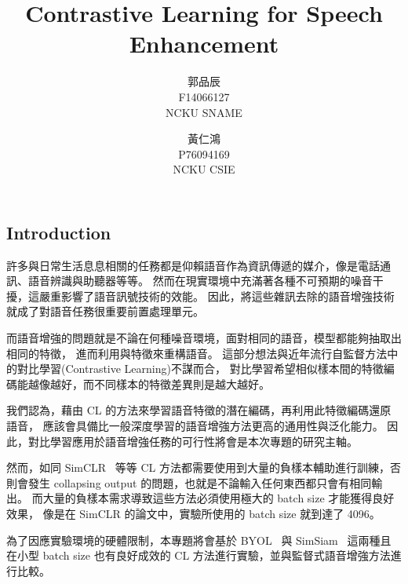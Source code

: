 \documentclass[10pt,twocolumn,letterpaper]{article}
\begin{document}
\begin{CJK}{UTF8}{bkai}
   \title{Contrastive Learning for Speech Enhancement}

   \author{
      郭品辰\\
      F14066127\\
      NCKU SNAME
      \and
      黃仁鴻\\
      P76094169\\
      NCKU CSIE
   }

   \maketitle



   \section{Introduction}

   許多與日常生活息息相關的任務都是仰賴語音作為資訊傳遞的媒介，像是電話通訊、語音辨識與助聽器等等。
   然而在現實環境中充滿著各種不可預期的噪音干擾，這嚴重影響了語音訊號技術的效能。
   因此，將這些雜訊去除的語音增強技術就成了對語音任務很重要前置處理單元。

   而語音增強的問題就是不論在何種噪音環境，面對相同的語音，模型都能夠抽取出相同的特徵，
   進而利用與特徵來重構語音。
   這部分想法與近年流行自監督方法中的對比學習(Contrastive Learning)不謀而合，
   對比學習希望相似樣本間的特徵編碼能越像越好，而不同樣本的特徵差異則是越大越好。

   我們認為，藉由 CL 的方法來學習語音特徵的潛在編碼，再利用此特徵編碼還原語音，
   應該會具備比一般深度學習的語音增強方法更高的通用性與泛化能力。
   因此，對比學習應用於語音增強任務的可行性將會是本次專題的研究主軸。

   然而，如同 SimCLR~\cite{DBLP:journals/corr/abs-2002-05709} 等等 CL 方法都需要使用到大量的負樣本輔助進行訓練，否則會發生
   collapsing output 的問題，也就是不論輸入任何東西都只會有相同輸出。
   而大量的負樣本需求導致這些方法必須使用極大的 batch size 才能獲得良好效果，
   像是在 SimCLR 的論文中，實驗所使用的 batch size 就到達了 4096。

   為了因應實驗環境的硬體限制，本專題將會基於 BYOL~\cite{DBLP:journals/corr/abs-2006-07733} 與
   SimSiam~\cite{DBLP:journals/corr/abs-2011-10566}
   這兩種且在小型 batch size 也有良好成效的 CL 方法進行實驗，並與監督式語音增強方法進行比較。


\end{CJK}
\end{document}
